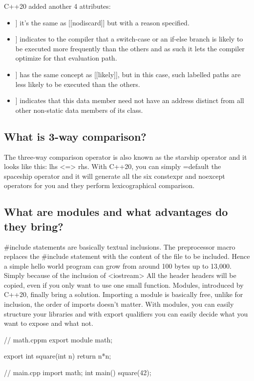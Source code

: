 \documentclass{report}
\begin{document}
\bigbreak \noindent 
C++20 added another 4 attributes:
\begin{itemize}
    \item \relax [[nodiscard("reason")]] it’s the same as [[nodiscard]] but with a reason specified.
    \item \relax [[likely]] indicates to the compiler that a switch-case or an if-else branch is likely to be executed more frequently than the others and as such it lets the compiler optimize for that evaluation path.
    \item \relax [[unlikely]] has the same concept as [[likely]], but in this case, such labelled paths are less likely to be executed than the others.
    \item \relax [[no\_unique\_address]] indicates that this data member need not have an address distinct from all other non-static data members of its class.
\end{itemize}

\bigbreak \noindent 
\subsection{What is 3-way comparison?}
\bigbreak \noindent 
The three-way comparison operator is also known as the starship operator and it looks like this: lhs <=> rhs.
\bigbreak \noindent 
With C++20, you can simply =default the spaceship operator and it will generate all the six constexpr and noexcept operators for you and they perform lexicographical comparison.

\bigbreak \noindent 
\subsection{What are modules and what advantages do they bring?}
\bigbreak \noindent 
#include statements are basically textual
inclusions. The preprocessor macro replaces the #include statement
with the content of the file to be included.
\bigbreak \noindent 
Hence a simple hello world program can grow from around 100
bytes up to 13,000. Simply because of the inclusion of <iostream>
\bigbreak \noindent 
All the header headers will be copied, even if you only want to use
one small function.
\bigbreak \noindent 
Modules, introduced by C++20, finally bring a solution. Importing
a module is basically free, unlike for inclusion, the order of imports
doesn’t matter.
\bigbreak \noindent 
With modules, you can easily structure your libraries and with
export qualifiers you can easily decide what you want to expose
and what not.
\bigbreak \noindent 
\begin{cppcode}
// math.cppm
export module math;

export int square(int n){
    return n*n;
}

// main.cpp
import math;
int main(){
    square(42);
}
\end{cppcode}
\end{document}
